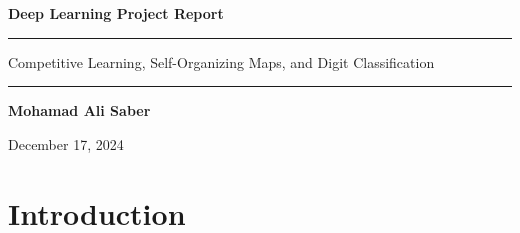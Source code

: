 \documentclass[12pt,a4paper]{report}
\begin{document}
\begin{titlepage}
  \centering
  \vspace*{2cm}
  {\Huge\bfseries\color{blue!50!black} Deep Learning Project Report \par}
  \vspace{0.5cm}
  \rule{\linewidth}{1.5pt}
  \vspace{0.4cm}
  {\large Competitive Learning, Self-Organizing Maps, and Digit Classification \par}
  \vspace{0.4cm}
  \rule{\linewidth}{0.5pt}
  \vspace{2cm}

  {\Large\bfseries Mohamad Ali Saber \par}
  \vspace{0.5cm}
  {\large December 17, 2024 \par}

  \vfill

  \begin{abstract}
    \noindent
    This report presents a comprehensive investigation of two machine learning paradigms:
    unsupervised clustering via Self-Organizing Maps (SOMs) and SOM-based digit
    classification. Two SOM architectures (4$\times$4 and 20$\times$20) are compared with
    respect to clustering quality, neuron utilization, and classification accuracy. In addition,
    prototype MATLAB implementations of competitive learning and SOM are described to
    provide conceptual grounding for the algorithmic mechanisms employed. The findings
    confirm that larger SOM architectures substantially improve representational quality,
    with the 20$\times$20 map achieving significantly higher classification accuracy.
  \end{abstract}

\end{titlepage}

\tableofcontents
\newpage

\chapter{Introduction}
\end{document}
